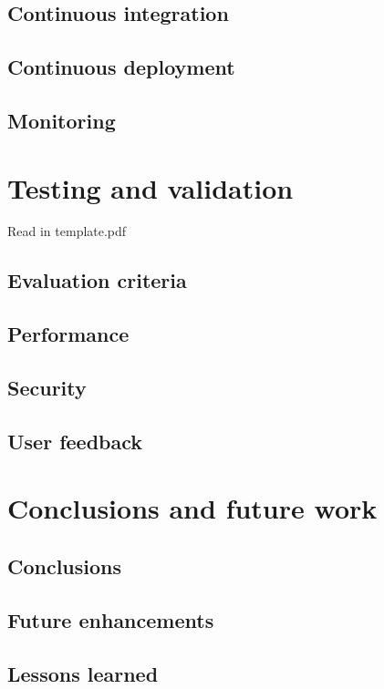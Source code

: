 \documentclass[12pt,a4paper]{report}
\begin{document}
\section{Continuous integration}

\section{Continuous deployment}

\section{Monitoring}



\chapter{Testing and validation}
Read in template.pdf
\section{Evaluation criteria}

\section{Performance}

\section{Security}

\section{User feedback}



\chapter{Conclusions and future work}
\section{Conclusions}

\section{Future enhancements}

\section{Lessons learned}
\end{document}
